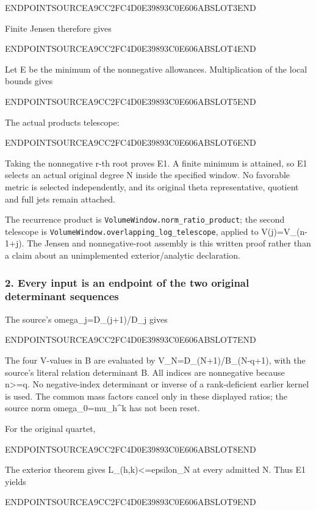 ENDPOINTSOURCEA9CC2FC4D0E39893C0E606ABSLOT3END

Finite Jensen therefore gives

ENDPOINTSOURCEA9CC2FC4D0E39893C0E606ABSLOT4END

Let E be the minimum of the nonnegative allowances. Multiplication of the local bounds gives

ENDPOINTSOURCEA9CC2FC4D0E39893C0E606ABSLOT5END

The actual products telescope:

ENDPOINTSOURCEA9CC2FC4D0E39893C0E606ABSLOT6END

Taking the nonnegative r-th root proves E1. A finite minimum is attained, so E1 selects an actual original degree N inside the specified window. No favorable metric is selected independently, and its original theta representative, quotient and full jets remain attached.

The recurrence product is \texttt{VolumeWindow.norm\_ratio\_product}; the second telescope is \texttt{VolumeWindow.overlapping\_log\_telescope}, applied to V(j)=V\_(n-1+j). The Jensen and nonnegative-root assembly is this written proof rather than a claim about an unimplemented exterior/analytic declaration.

\subsubsection{2. Every input is an endpoint of the two original determinant sequences}\label{endpoint-pr23_corrected--every-input-is-an-endpoint-of-the-two-original-determinant-sequences}

The source's omega\_j=D\_(j+1)/D\_j gives

ENDPOINTSOURCEA9CC2FC4D0E39893C0E606ABSLOT7END

The four V-values in B are evaluated by V\_N=D\_(N+1)/B\_(N-q+1), with the source's literal relation determinant B. All indices are nonnegative because n\textgreater=q. No negative-index determinant or inverse of a rank-deficient earlier kernel is used. The common mass factors cancel only in these displayed ratios; the source norm omega\_0=mu\_h\^{}k has not been reset.

For the original quartet,

ENDPOINTSOURCEA9CC2FC4D0E39893C0E606ABSLOT8END

The exterior theorem gives L\_(h,k)\textless=epsilon\_N at every admitted N. Thus E1 yields

ENDPOINTSOURCEA9CC2FC4D0E39893C0E606ABSLOT9END

